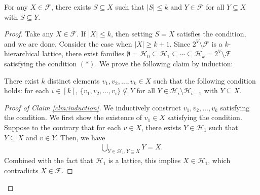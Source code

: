 \documentclass[10pt,a4paper]{amsart}
\begin{document}
\begin{lemma}
\label{lem:key}
For any $X\in \mathcal{F}$, there exists $S\subseteq X$ such that $|S|\le k$ and $Y\in \mathcal{F}$ for all $Y\subseteq X$ with $S\subseteq Y$.
\end{lemma}

\begin{proof}
Take any $X\in \mathcal{F}$.
If $|X|\le k$, then setting $S=X$ satisfies the condition, and we are done.
Consider the case when $|X|\ge k+1$.
Since $2^V\setminus \mathcal{F}$ is a $k$-hierarchical lattice, there exist families $\emptyset=\mathcal{H}_0\subseteq \mathcal{H}_1\subseteq  \cdots \subseteq \mathcal{H}_k=2^V\setminus \mathcal{F}$ satisfying the condition $(*)$.
We prove the following claim by induction:
\begin{claim}
\label{clm:induction}
There exist $k$ distinct elements $v_1,v_2,\ldots,v_k\in X$ such that the following condition holds: for each $i\in [k]$, $\{v_1,v_2,\ldots,v_i\}\not\subseteq Y$ for all $Y\in \mathcal{H}_i\setminus \mathcal{H}_{i-1}$ with $Y\subseteq X$.
\end{claim}
\begin{proof}[Proof of Claim \ref{clm:induction}]
We inductively construct $v_1,v_2,\ldots,v_k$ satisfying the condition.
We first show the existence of $v_1\in X$ satisfying the condition.
Suppose to the contrary that for each $v\in X$, there exists $Y\in \mathcal{H}_1$ such that $Y\subseteq X$ and $v\in Y$.
Then, we have
\begin{align*}
\bigcup_{Y\in \mathcal{H}_1,Y\subseteq X}Y=X.
\end{align*}
Combined with the fact that $\mathcal{H}_1$ is a lattice, this implies $X\in \mathcal{H}_1$, which contradicts $X\in \mathcal{F}$.


\end{proof}
\end{proof}
\end{document}
